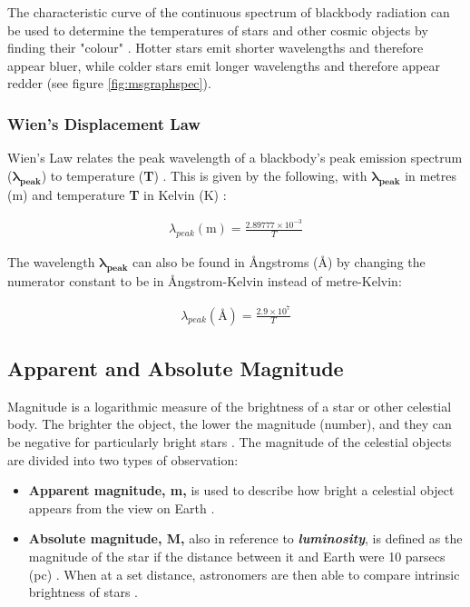 \documentclass[12pt]{article}
\begin{document}
The characteristic curve of the continuous spectrum of blackbody radiation can be used to determine the temperatures of stars and other cosmic objects by finding their "colour" \cite{ESAblackbodyrad}.
Hotter stars emit shorter wavelengths and therefore appear bluer, while colder stars emit longer wavelengths and therefore appear redder (see figure \ref{fig:msgraphspec}).


\subsubsection{Wien's Displacement Law}

Wien's Law relates the peak wavelength of a blackbody's peak emission spectrum ($\mathbf{\lambda_{peak}}$) to temperature (\textbf{T}) \cite{derivwien}.
This is given by the following, with $\mathbf{\lambda_{peak}}$ in metres (m) and temperature \textbf{T} in Kelvin (K) \cite{derivwien}:

\vspace{-1.5ex}
\begin{gather}
    \lambda_{peak} (\text{m}) = \frac{2.89777 \times 10 ^{-3}}{T} 
\end{gather}

The wavelength $\mathbf{\lambda_{peak}}$ can also be found in Ångstroms (Å) by changing the numerator constant to be in Ångstrom-Kelvin instead of metre-Kelvin:

\vspace{-1.5ex}
\begin{gather}
    \lambda_{peak} (\text{\AA}) = \frac{2.9 \times 10^7}{T}
\end{gather}

\vspace{1.5cm}
\subsection{Apparent and Absolute Magnitude} \label{sec:1.1.3}

Magnitude is a logarithmic measure of the brightness of a star or other celestial body. The brighter the object, the lower the magnitude (number), and they can be negative for particularly bright stars
\cite{britmag}.
The magnitude of the celestial objects are divided into two types of observation:

\begin{itemize}
    \item \textbf{Apparent magnitude, m,} is used to describe how bright a celestial object appears from the view on Earth
    \cite{lcomag}.
    \item \textbf{Absolute magnitude, M,} also in reference to \textbf{\textit{luminosity}}, is defined as the magnitude of the star if the distance between it and Earth were 10 parsecs (pc)
    \cite{lcoabsmag,cosmosabsmag}.
    When at a set distance, astronomers are then able to compare intrinsic brightness of stars
    \cite{cosmosabsmag}.
\end{itemize}
\end{document}
